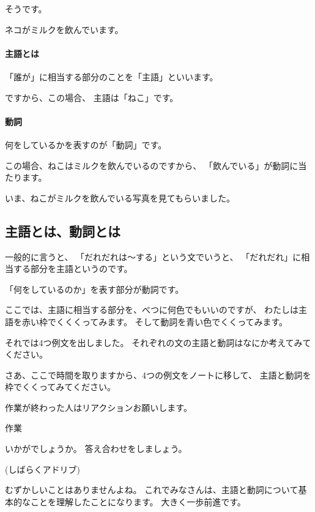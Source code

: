 \documentclass[12pt]{jlreq}
\begin{document}
そうです。

ネコがミルクを飲んでいます。

\paragraph{主語とは}
「誰が」に相当する部分のことを「主語」といいます。

ですから、この場合、
主語は「ねこ」です。

\paragraph{動詞}
何をしているかを表すのが「動詞」です。

この場合、ねこはミルクを飲んでいるのですから、
「飲んでいる」が動詞に当たります。

いま、ねこがミルクを飲んでいる写真を見てもらいました。

{\large \ComputerMouse}

\subsection{主語とは、動詞とは}


一般的に言うと、
「だれだれは〜する」という文でいうと、
「だれだれ」に相当する部分を主語というのです。

「何をしているのか」を表す部分が動詞です。

ここでは、主語に相当する部分を、べつに何色でもいいのですが、
わたしは主語を赤い枠でくくくってみます。
そして動詞を青い色でくくってみます。

{\large \ComputerMouse}

それでは4つ例文を出しました。
それぞれの文の主語と動詞はなにか考えてみてください。

さあ、ここで時間を取りますから、4つの例文をノートに移して、
主語と動詞を枠でくくってみてください。

作業が終わった人はリアクションお願いします。

\hrulefill

\hfill{}作業\hfill

\hrulefill


いかがでしょうか。
答え合わせをしましょう。

{\large \ComputerMouse}

(しばらくアドリブ)

むずかしいことはありませんよね。
これでみなさんは、主語と動詞について基本的なことを理解したことになります。
大きく一歩前進です。
\end{document}
